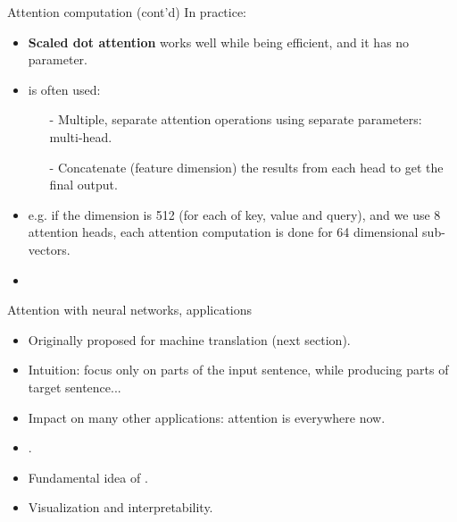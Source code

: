 \begin{frame}{Attention computation (cont'd)}
In practice:
\begin{itemize}
\item \textbf{Scaled dot attention} works well while being efficient, and it has no parameter.
\item {} is often used:
\begin{itemize}
\item[-] Multiple, separate attention operations using separate parameters: multi-head.
\item[-] Concatenate (feature dimension) the results from each head to get the final output.
\end{itemize}
\item e.g. if the dimension is 512 (for each of key, value and query), and we use 8 attention heads, each attention computation
is done for 64 dimensional sub-vectors.
\item {}
\end{itemize}
\end{frame}



\begin{frame}{Attention with neural networks, applications}
\begin{itemize}
\item Originally proposed for machine translation (next section).
\item Intuition: focus only on parts of the input sentence, while producing parts of target sentence...
\item Impact on many other applications: attention is everywhere now.
\item {}.
\item Fundamental idea of .
\item Visualization and interpretability.
\end{itemize}
\end{frame}



